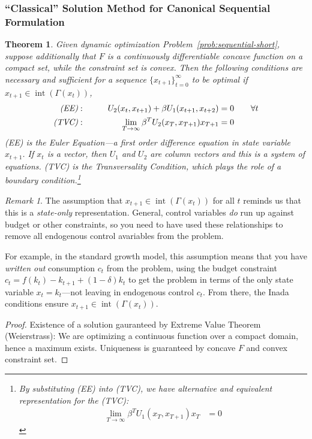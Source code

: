 \documentclass[12pt]{article}
\numberwithin{equation}{section} %
\theoremstyle{plain}
\newtheorem{thm}{Theorem}[section]
\theoremstyle{definition}
\theoremstyle{remark}
\newtheorem*{rmk}{Remark}
\newcommand{\ra}{\rightarrow}
\newcommand{\interior}{\operatorname{int}}
\newcommand{\tinfz}{_{t=0}^\infty}
\begin{document}
\clearpage
\subsubsection{``Classical'' Solution Method for Canonical Sequential
Formulation}

\begin{thm}
Given dynamic optimization Problem~\ref{prob:sequential-short}, suppose
additionally that $F$ is a continuously differentiable concave function
on a compact set, while the constraint set is convex. Then the following
conditions are necessary and sufficient for a sequence
$\{x_{t+1}\}\tinfz$ to be optimal if
$x_{t+1}\in \interior(\Gamma(x_t))$,
\begin{alignat*}{3}
  \text{\emph{(EE)}}:&&
  \qquad
  U_2(x_{t},x_{t+1}) + \beta U_1(x_{t+1},x_{t+2})
  &= 0
  \qquad\forall t
  \\
  \text{\emph{(TVC)}}:&&
  \lim_{T\ra\infty}
  \beta^T U_2(x_{T},x_{T+1})
  x_{T+1}
  &= 0
\end{alignat*}
(EE) is the Euler Equation---a first order difference equation in state
variable $x_{t+1}$. If $x_t$ is a vector, then $U_1$ and $U_2$ are
column vectors and this is a system of equations.
(TVC) is the \emph{Transversality Condition}, which plays the role of a
boundary condition.\footnote{%
  By substituting (EE) into (TVC), we have alternative
  and equivalent representation for the (TVC):
  \begin{align*}
    \lim_{T\ra\infty}
    \beta^{T}
    U_1(x_{T},x_{T+1})
    x_{T}
    &= 0
  \end{align*}
}
\end{thm}
\begin{rmk}
The assumption that $x_{t+1}\in\interior(\Gamma(x_t))$ for all $t$
reminds us that this is a \emph{state-only} representation.
General, control variables \emph{do} run up against budget or other
constraints, so you need to have used these relationships to remove
all endogenous control avariables from the problem.

For example, in the standard growth model, this assumption
means that you have \emph{written out} consumption $c_t$ from the
problem, using the budget constraint $c_t = f(k_t) - k_{t+1} +
(1-\delta) k_t$ to get the problem in terms of the only state variable
$x_t=k_t$---not leaving in endogenous control $c_t$.  From there, the
Inada conditions ensure $x_{t+1}\in \interior(\Gamma(x_t))$.
\end{rmk}
\begin{proof}
Existence of a solution gauranteed by Extreme Value Theorem
(Weierstrass): We are optimizing a continuous function over a compact
domain, hence a maximum exists. Uniqueness is guaranteed by concave $F$
and convex constraint set.
\end{proof}
\end{document}
